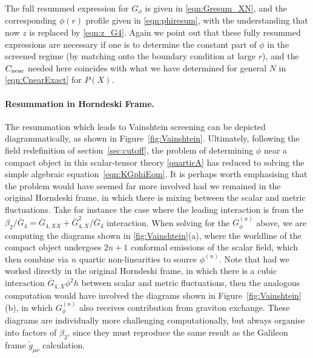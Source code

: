 \documentclass[11pt]{article}
\begin{document}
The full resummed expression for $G_\phi$ is given in \eqref{eqn:Gresum_XN}, and the corresponding $\phi (r)$ profile given in \eqref{eqn:phiresum}, with the understanding that now $z$ is replaced by \eqref{eqn:z_G4}. 
Again we point out that these fully resummed expressions are necessary if one is to determine the constant part of $\phi$ in the screened regime (by matching onto the boundary condition at large $r$), and the $C_{\rm near}$ needed here coincides with what we have determined for general $N$ in \eqref{eqn:CnearExact} for $P(X)$.


\paragraph{Resummation in Horndeski Frame.}
The resummation which leads to Vainshtein screening can be depicted diagrammatically, as shown in Figure~\ref{fig:Vainshtein}. Ultimately, following the field redefinition of section~\ref{sec:cutoff}, the problem of determining $\phi$ near a compact object in this scalar-tensor theory \eqref{quarticA} has reduced to solving the simple algebraic equation~\eqref{eqn:KGphiEom}.
It is perhaps worth emphasising that the problem would have seemed far more involved had we remained in the original Horndeski frame, in which there is mixing between the scalar and metric fluctuations.  
%
Take for instance the case where the leading interaction is from the $\beta_2/\bar{G}_4 = \bar{G}_{4,XX} + \bar{G}_{4,X}^2/\bar{G}_4$ interaction. 
When solving for the $G_{\phi}^{(n)}$ above, we are computing the diagrams shown in \ref{fig:Vainshtein}(a), where the worldline of the compact object undergoes $2n+1$ conformal emissions of the scalar field, which then combine via $n$ quartic non-linearities to source $\phi^{(n)}$. 
Note that had we worked directly in the original Horndeski frame, in which there is a cubic interaction $\bar{G}_{4,X} \phi^2 h$ between scalar and metric fluctuations, then the analogous computation would have involved the diagrams shown in Figure~\ref{fig:Vainshtein}(b), in which $G_\phi^{(n)}$ also receives contribution from graviton exchange. These diagrams are individually more challenging computationally, but always organise into factors of $\beta_2$, since they must reproduce the same result as the Galileon frame $\tilde{g}_{\mu\nu}$ calculation.  
\end{document}
